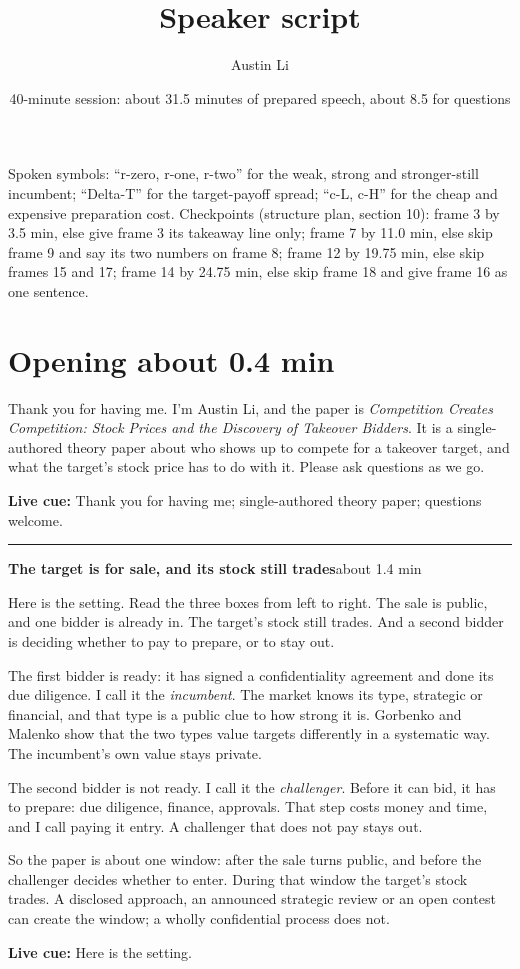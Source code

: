 \documentclass[11pt]{article}
\title{Speaker script\\[0.25em]\large \PaperTitle}
\author{Austin Li}
\date{40-minute session: about 31.5 minutes of prepared speech, about 8.5 for questions}
\newcommand{\PaperTitle}{Competition Creates Competition: Stock Prices and the Discovery of Takeover Bidders}
\newcommand{\Cue}[1]{\par\nobreak\smallskip\noindent
  \textcolor{ScriptGray}{\footnotesize\textbf{Live cue:} #1}\par}
\newcommand{\scriptopening}[2]{%
  \Needspace{10\baselineskip}%
  \section*{Opening \hfill\normalfont\small\textcolor{ScriptGray}{#1}}
  #2\par}
\newcommand{\scriptframe}[3]{%
  \Needspace{9\baselineskip}%
  \par\medskip\noindent\textcolor{ScriptBlue}{\rule{\linewidth}{0.55pt}}%
  \par\smallskip\noindent
  \textbf{#1}\hfill\textcolor{ScriptGray}{\small #2}\par\smallskip
  #3\par}
\begin{document}
\maketitle
\thispagestyle{fancy}

{\small\textcolor{ScriptGray}{Spoken symbols: ``r-zero, r-one, r-two'' for the weak, strong and
stronger-still incumbent; ``Delta-T'' for the target-payoff spread; ``c-L, c-H'' for the cheap and
expensive preparation cost. Checkpoints (structure plan, section 10): frame 3 by 3.5 min, else give
frame 3 its takeaway line only; frame 7 by 11.0 min, else skip frame 9 and say its two numbers on
frame 8; frame 12 by 19.75 min, else skip frames 15 and 17; frame 14 by 24.75 min, else skip frame 18
and give frame 16 as one sentence.}\par}

\scriptopening{about 0.4 min}{%
  Thank you for having me. I'm Austin Li, and the paper is \emph{\PaperTitle}.
  It is a single-authored theory paper about who shows up to compete for a
  takeover target, and what the target's stock price has to do with it. Please
  ask questions as we go.
  \Cue{Thank you for having me; single-authored theory paper; questions welcome.}
}

\scriptframe{The target is for sale, and its stock still trades}{about 1.4 min}{%
  Here is the setting. Read the three boxes from left to right. The sale is
  public, and one bidder is already in. The target's stock still trades. And a
  second bidder is deciding whether to pay to prepare, or to stay out.

  The first bidder is ready: it has signed a confidentiality agreement and done its due diligence.
  I call it the \emph{incumbent}. The market knows its type, strategic or
  financial, and that type is a public clue to how strong it is. Gorbenko and
  Malenko show that the two types value targets differently in a systematic
  way. The incumbent's own value stays private.

  The second bidder is not ready. I call it the \emph{challenger}. Before it
  can bid, it has to prepare: due diligence, finance, approvals. That step
  costs money and time, and I call paying it entry. A challenger that does not
  pay stays out.

  So the paper is about one window: after the sale turns public, and before the
  challenger decides whether to enter. During that window the target's stock
  trades. A disclosed approach, an announced strategic review or an open
  contest can create the window; a wholly confidential process does not.
  \Cue{Here is the setting.}
}
\end{document}
